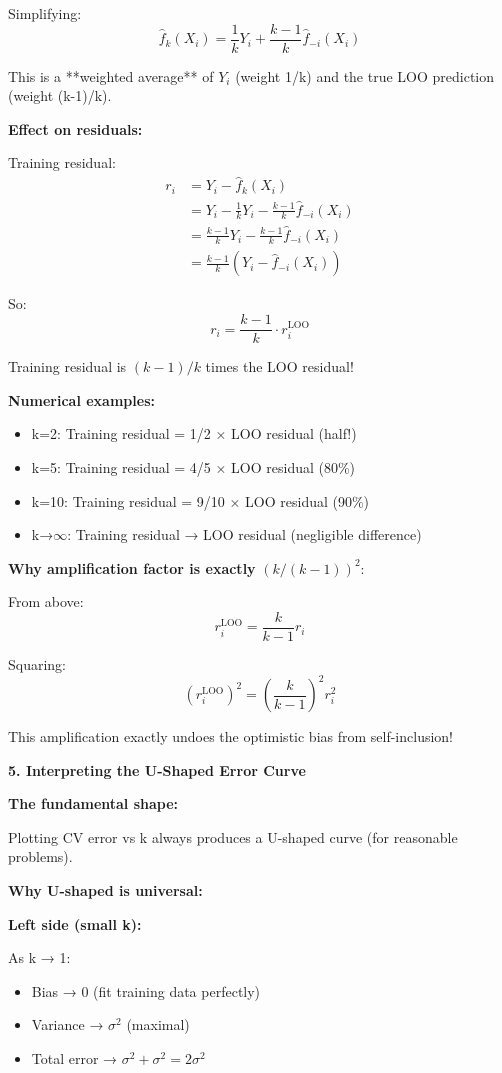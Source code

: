 \documentclass[12pt]{article}
\begin{document}
\begin{explanation}
Simplifying:
\[
\hat{f}_k(X_i) = \frac{1}{k}Y_i + \frac{k-1}{k}\hat{f}_{-i}(X_i)
\]

This is a **weighted average** of $Y_i$ (weight 1/k) and the true LOO prediction (weight (k-1)/k).

\textbf{Effect on residuals:}

Training residual:
\begin{align*}
r_i &= Y_i - \hat{f}_k(X_i) \\
&= Y_i - \frac{1}{k}Y_i - \frac{k-1}{k}\hat{f}_{-i}(X_i) \\
&= \frac{k-1}{k}Y_i - \frac{k-1}{k}\hat{f}_{-i}(X_i) \\
&= \frac{k-1}{k}(Y_i - \hat{f}_{-i}(X_i))
\end{align*}

So:
\[
r_i = \frac{k-1}{k} \cdot r_i^{\text{LOO}}
\]

Training residual is $(k-1)/k$ times the LOO residual!

\textbf{Numerical examples:}

\begin{itemize}
    \item k=2: Training residual = 1/2 × LOO residual (half!)
    \item k=5: Training residual = 4/5 × LOO residual (80\%)
    \item k=10: Training residual = 9/10 × LOO residual (90\%)
    \item k→$\infty$: Training residual → LOO residual (negligible difference)
\end{itemize}

\textbf{Why amplification factor is exactly} $(k/(k-1))^2$:

From above:
\[
r_i^{\text{LOO}} = \frac{k}{k-1} r_i
\]

Squaring:
\[
(r_i^{\text{LOO}})^2 = \left(\frac{k}{k-1}\right)^2 r_i^2
\]

This amplification exactly undoes the optimistic bias from self-inclusion!

\textbf{5. Interpreting the U-Shaped Error Curve}

\textbf{The fundamental shape:}

Plotting CV error vs k always produces a U-shaped curve (for reasonable problems).

\textbf{Why U-shaped is universal:}

\textbf{Left side (small k):}

As k → 1:
\begin{itemize}
    \item Bias → 0 (fit training data perfectly)
    \item Variance → $\sigma^2$ (maximal)
    \item Total error → $\sigma^2 + \sigma^2 = 2\sigma^2$
\end{itemize}


\end{explanation}
\end{document}
